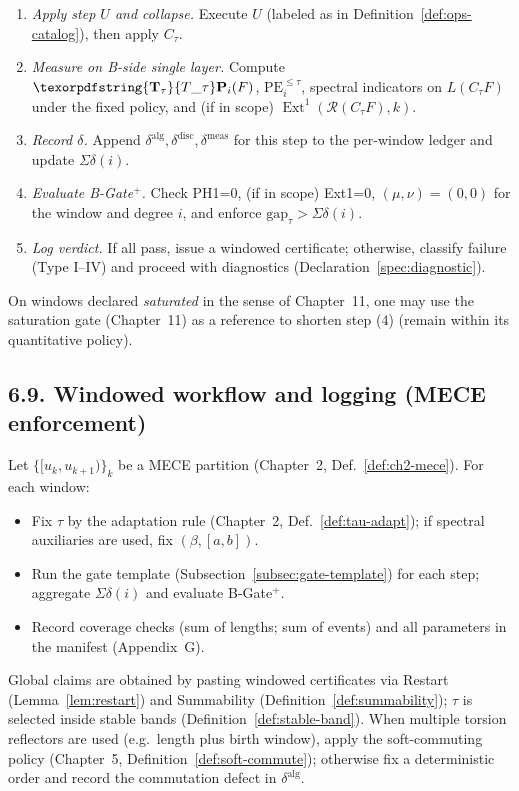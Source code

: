 \documentclass[11pt]{article}
\numberwithin{equation}{section}
\theoremstyle{plain}
\theoremstyle{definition}
\theoremstyle{remark}
\DeclareMathOperator{\Ext}{Ext}
\DeclareRobustCommand{\hyp}{\nobreakdash-}
\newcommand{\Rfun}{\mathcal{R}}
\theoremstyle{plain}
\theoremstyle{definition}
\numberwithin{equation}{section}
\theoremstyle{definition}
\DeclareRobustCommand{\Ttau}{\texorpdfstring{\ensuremath{\mathbf{T}_{\tau}}}{T\_\tau}}
\numberwithin{equation}{section}
\theoremstyle{plain}
\theoremstyle{definition}
\theoremstyle{remark}
\providecommand{\Tfun}[1]{\mathbf{T}_{#1}}
\providecommand{\Ttau}{\Tfun{\tau}}
\begin{document}
\begin{enumerate}
  \item \emph{Apply step $U$ and collapse.} Execute $U$ (labeled as in Definition~\ref{def:ops-catalog}), then apply $C_\tau$.
  \item \emph{Measure on B\hyp side single layer.} Compute $\Ttau\mathbf{P}_i(F)$, $\mathrm{PE}_i^{\le\tau}$, spectral indicators on $L(C_\tau F)$ under the fixed policy, and (if in scope) $\Ext^1(\Rfun(C_\tau F),k)$.
  \item \emph{Record $\delta$.} Append $\delta^{\mathrm{alg}},\delta^{\mathrm{disc}},\delta^{\mathrm{meas}}$ for this step to the per\hyp window ledger and update $\Sigma\delta(i)$.
  \item \emph{Evaluate B\hyp Gate$^{+}$.} Check PH1=0, (if in scope) Ext1=0, $(\mu,\nu)=(0,0)$ for the window and degree $i$, and enforce $\mathrm{gap}_\tau>\Sigma\delta(i)$.
  \item \emph{Log verdict.} If all pass, issue a windowed certificate; otherwise, classify failure (Type I–IV) and proceed with diagnostics (Declaration~\ref{spec:diagnostic}).
\end{enumerate}
On windows declared \emph{saturated} in the sense of Chapter~11, one may use the saturation gate (Chapter~11) as a reference to shorten step (4) (remain within its quantitative policy).

\subsection*{6.9. Windowed workflow and logging (MECE enforcement)}\label{subsec:window-workflow}
Let \(\{[u_k,u_{k+1})\}_k\) be a MECE partition (Chapter~2, Def.~\ref{def:ch2-mece}). For each window:
\begin{itemize}
  \item Fix \(\tau\) by the adaptation rule (Chapter~2, Def.~\ref{def:tau-adapt}); if spectral auxiliaries are used, fix \((\beta,[a,b])\).
  \item Run the gate template (Subsection~\ref{subsec:gate-template}) for each step; aggregate $\Sigma\delta(i)$ and evaluate B\hyp Gate$^{+}$.
  \item Record coverage checks (sum of lengths; sum of events) and all parameters in the manifest (Appendix~G).
\end{itemize}
Global claims are obtained by pasting windowed certificates via Restart (Lemma~\ref{lem:restart}) and Summability (Definition~\ref{def:summability}); $\tau$ is selected inside stable bands (Definition~\ref{def:stable-band}). When multiple torsion reflectors are used (e.g.\ length plus birth window), apply the soft\hyp commuting policy (Chapter~5, Definition~\ref{def:soft-commute}); otherwise fix a deterministic order and record the commutation defect in $\delta^{\mathrm{alg}}$.
\end{document}

